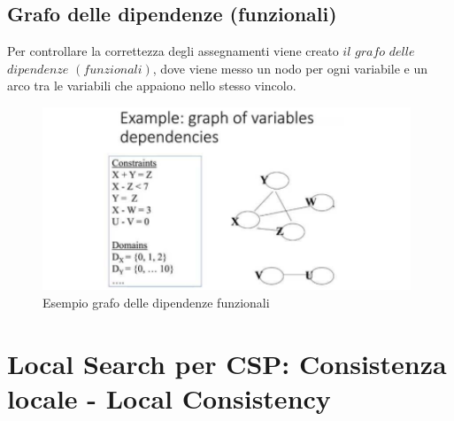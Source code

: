 \section{Grafo delle dipendenze (funzionali)}
Per controllare la correttezza degli assegnamenti viene creato $il$ $grafo$ $delle$ $dipendenze$   $(funzionali)$, dove viene messo un nodo per ogni variabile e un arco tra le variabili che appaiono nello stesso vincolo.
\begin{figure}[htp]
    \centering
    \includegraphics[width=11cm, keepaspectratio]{img/Cap2/grafo-funzionali.png}
    \caption{Esempio grafo delle dipendenze funzionali}
\end{figure}
\chapter{Local Search per CSP: Consistenza locale - Local Consistency} \label{ch:Local Search per Crisp CSP: Consistenza locale}
